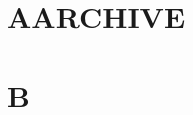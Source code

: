 \documentclass[11pt]{article}
\author{root}
\date{\today}
\title{}
\begin{document}
\tableofcontents

\section{A\hfill{}\textsc{ARCHIVE}}
\label{sec:orgc91fac1}
\section{B}
\label{sec:org025407f}
\end{document}
